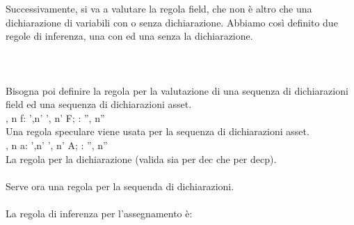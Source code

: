 \documentclass[12pt, a4paper]{report}
\begin{document}
Successivamente, si va a valutare la regola field, che non è altro che una dichiarazione di variabili con o senza dichiarazione. Abbiamo così definito due regole di inferenza, una con ed una senza la dichiarazione.
\\
\\
\\
\\
Bisogna poi definire la regola per la valutazione di una sequenza di dichiarazioni field ed una sequenza di dichiarazioni asset.\\ 
{\Gamma, n \vdash f: \Gamma',n' \; \Gamma', n' \vdash F; : \Gamma'', n'' }\\
Una regola speculare viene usata per la sequenza di dichiarazioni asset.\\
{\Gamma, n \vdash a: \Gamma',n' \;\;\;\;\;\; \Gamma', n' \vdash A; : \Gamma'', n'' }\\
La regola per la dichiarazione (valida sia per dec che per decp). \\
\\
Serve ora una regola per la sequenda di dichiarazioni.\\ 
\\
La regola di inferenza per l'assegnamento è: 
\end{document}
